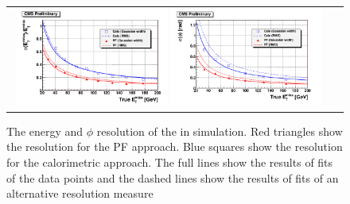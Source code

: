 \begin{figure}[tbh!]
	\centering
	\begin{tabular}{cc}
		\includegraphics[width=0.48\textwidth]{objreconstruction/pics/true_met-a.png}
		\includegraphics[width=0.48\textwidth]{objreconstruction/pics/true_met-b.png} 		
	\end{tabular}
	\caption{The energy and \ensuremath{\phi} resolution of the \met in simulation. Red triangles show the resolution for the PF approach. Blue squares show the resolution for the calorimetric approach. The full lines show the results of fits of the data points and the dashed lines show the results of fits of an alternative resolution measure \cite{CMS:2009nxa}}
	\label{fig:true_met}
\end{figure}

\clearpage